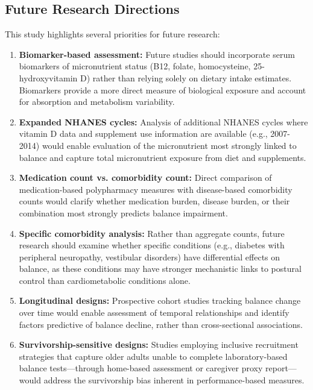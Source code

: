\documentclass[11pt,a4paper]{article}
\begin{document}
\subsection{Future Research Directions}

This study highlights several priorities for future research:

\begin{enumerate}
    \item \textbf{Biomarker-based assessment:} Future studies should incorporate serum biomarkers of micronutrient status (B12, folate, homocysteine, 25-hydroxyvitamin D) rather than relying solely on dietary intake estimates. Biomarkers provide a more direct measure of biological exposure and account for absorption and metabolism variability.
    
    \item \textbf{Expanded NHANES cycles:} Analysis of additional NHANES cycles where vitamin D data and supplement use information are available (e.g., 2007-2014) would enable evaluation of the micronutrient most strongly linked to balance and capture total micronutrient exposure from diet and supplements.
    
    \item \textbf{Medication count vs. comorbidity count:} Direct comparison of medication-based polypharmacy measures with disease-based comorbidity counts would clarify whether medication burden, disease burden, or their combination most strongly predicts balance impairment.
    
    \item \textbf{Specific comorbidity analysis:} Rather than aggregate counts, future research should examine whether specific conditions (e.g., diabetes with peripheral neuropathy, vestibular disorders) have differential effects on balance, as these conditions may have stronger mechanistic links to postural control than cardiometabolic conditions alone.
    
    \item \textbf{Longitudinal designs:} Prospective cohort studies tracking balance change over time would enable assessment of temporal relationships and identify factors predictive of balance decline, rather than cross-sectional associations.
    
    \item \textbf{Survivorship-sensitive designs:} Studies employing inclusive recruitment strategies that capture older adults unable to complete laboratory-based balance tests—through home-based assessment or caregiver proxy report—would address the survivorship bias inherent in performance-based measures.
\end{enumerate}
\end{document}

